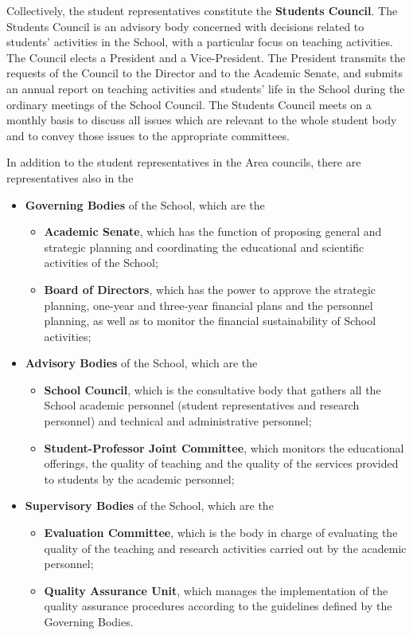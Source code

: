 \documentclass{sissavademecum}
\begin{document}
Collectively, the student representatives constitute the \textbf{Students Council}. The Students Council is an advisory body concerned with decisions related to students' activities in the School, with a particular focus on teaching activities. The Council elects a President and a Vice-President. The President transmits the requests of the Council to the Director and to the Academic Senate, and submits an annual report on teaching activities and students' life in the School during the ordinary meetings of the School Council. The Students Council meets on a monthly basis to discuss all issues which are relevant to the whole student body and to convey those issues to the appropriate committees.

In addition to the student representatives in the Area councils, there are representatives also in the
\begin{itemize}
    \item \textbf{Governing Bodies} of the School, which are the
    \begin{itemize}
        \item \textbf{Academic Senate}, which has the function of proposing general and strategic planning and coordinating the educational and scientific activities of the School;
        \item \textbf{Board of Directors}, which has the power to approve the strategic planning, one-year and three-year financial plans and the personnel planning, as well as to monitor the financial sustainability of School activities;
    \end{itemize}
    \item \textbf{Advisory Bodies} of the School, which are the
    \begin{itemize}
        \item \textbf{School Council}, which is the consultative body that gathers all the School academic personnel (student representatives and research personnel) and technical and administrative personnel;
        \item \textbf{Student-Professor Joint Committee}, which monitors the educational offerings, the quality of teaching and the quality of the services provided to students by the academic personnel;
    \end{itemize}
    \item \textbf{Supervisory Bodies} of the School, which are the
    \begin{itemize}
        \item \textbf{Evaluation Committee}, which is the body in charge of evaluating the quality of the teaching and research activities carried out by the academic personnel;
        \item \textbf{Quality Assurance Unit}, which manages the implementation of the quality assurance procedures according to the guidelines defined by the Governing Bodies.
    \end{itemize}
\end{itemize}
\end{document}
